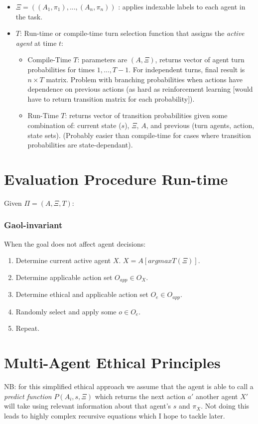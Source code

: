 \documentclass{article}
\begin{document}
\begin{itemize}
\item $\Xi=((A_1,\pi_1), ... , (A_n, \pi_n))$ : applies indexable labels to each agent in the task.
\item $T$: Run-time or compile-time turn selection function that assigns the \textit{active agent} at time $t$:
\begin{itemize}
\item Compile-Time $T$: parameters are $(A, \Xi)$, returns vector of agent turn probabilities for times $1,...,T-1$. For independent turns, final result is $n \times T$ matrix. Problem with branching probabilities when actions have dependence on previous actions (as hard as reinforcement learning [would have to return transition matrix for each probability]).
\item Run-Time $T$: returns vector of transition probabilities given some combination of: current state ($s$), $\Xi$, $A$, and previous (turn agents, action, state sets). (Probably easier than compile-time for cases where transition probabilities are state-dependant).
\end{itemize}
\end{itemize}

\section{Evaluation Procedure Run-time}
Given $\Pi=(A, \Xi, T)$:

\subsubsection*{Gaol-invariant}
When the goal does not affect agent decisions:
\begin{enumerate}
\item Determine current active agent $X$. $X = A[argmax T(\Xi)]$.
\item Determine applicable action set $O_{app} \in O_X$.
\item Determine ethical and applicable action set $O_{e} \in O_{app}$.
\item Randomly select and apply some $o \in O_{e}$.
\item Repeat.

\end{enumerate}

\section{Multi-Agent Ethical Principles}
NB: for this simplified ethical approach we assume that the agent is able to call a \textit{predict function} $P(A_i, s, \Xi)$ which returns the next action $a'$ another agent $X'$ will take using relevant information about that agent's $s$ and $\pi_X$. Not doing this leads to highly complex recursive equations which I hope to tackle later.
\end{document}
